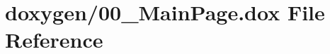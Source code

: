 \hypertarget{00__MainPage_8dox}{\section{doxygen/00\+\_\+\+Main\+Page.dox File Reference}
\label{00__MainPage_8dox}
}
